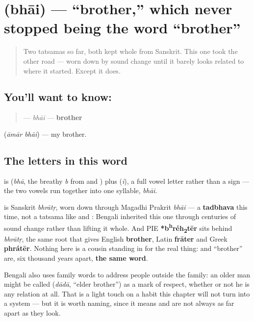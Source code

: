 \section[\texorpdfstring{\bn{ভাই} (bhāi)}{ভাই (bhāi)}]{ (bhāi) — \textquotedblleft{}brother,\textquotedblright{} which never stopped being the word \textquotedblleft{}brother\textquotedblright{}}

\label{lesson:BN-C11-bhai}



\begin{quote}
Two tatsamas so far, both kept whole from Sanskrit. This one took the other road — worn down by sound change until it barely looks related to where it started. Except it does.
\end{quote}

\subsection*{You'll want to know: }
\begin{quote}
\textbf{} — \emph{bhāi} — \textbf{brother}
\end{quote}

\textbf{ } (\emph{āmār bhāi}) — my brother.

\subsection*{The letters in this word}
\textbf{} is \textbf{} (\emph{bhā}, the breathy \emph{b} from  and ) plus \textbf{} (\emph{i}), a full vowel letter rather than a sign — the two vowels run together into one syllable, \emph{bhāi}.

\begin{cousinweb}
\textbf{} is Sanskrit \emph{bhrātṛ}, worn down through Magadhi Prakrit \emph{bhāi} — a \textbf{tadbhava} this time, not a tatsama like  and : Bengali inherited this one through centuries of sound change rather than lifting it whole. And PIE \textbf{*b\textsuperscript{h}réh\textsubscript{2}tēr} sits behind \emph{bhrātṛ}, the same root that gives English \textbf{brother}, Latin \textbf{frāter} and Greek \textbf{phrátēr}. Nothing here is a cousin standing in for the real thing:  and \textquotedblleft{}brother\textquotedblright{} are, six thousand years apart, \textbf{the same word}.

Bengali also uses family words to address people outside the family: an older man might be called \textbf{} (\emph{dādā}, \textquotedblleft{}elder brother\textquotedblright{}) as a mark of respect, whether or not he is any relation at all. That is a light touch on a habit this chapter will not turn into a system — but it is worth naming, since it means  and  are not always as far apart as they look.
\end{cousinweb}

